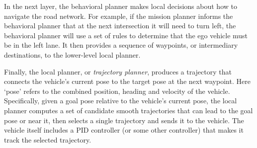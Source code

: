 In the next layer, the behavioral planner makes local decisions about how to navigate the road network. For example, if the mission planner informs the behavioral planner that at the next intersection it will need to turn left, the behavioral planner will use a set of rules to determine that the ego vehicle must be in the left lane.
It then provides a sequence of waypoints, or intermediary destinations, to the lower-level local planner. 

Finally, the local planner, or \emph{trajectory planner}, produces a trajectory that connects the vehicle's current pose to the target pose at the next waypoint. 
Here `pose' refers to the combined position, heading and velocity of the vehicle.
Specifically, given a goal pose relative to the vehicle's current pose, the local planner computes a set of candidate smooth trajectories that can lead to the goal pose or near it, then selects a single trajectory and sends it to the vehicle. 
The vehicle itself includes a PID controller (or some other controller) that makes it track the selected trajectory.